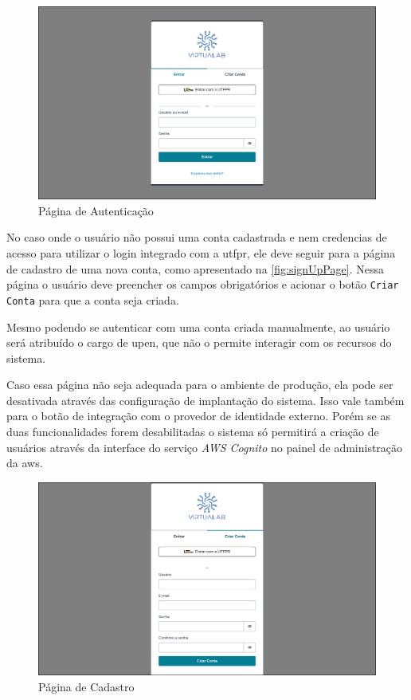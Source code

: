 \begin{figure}[H]
\caption{Página de Autenticação}
\label{fig:signInPage}
\includegraphics[width=\textwidth]{capitulos/3-resultados/files/sign-in.png}
\end{figure}

No caso onde o usuário não possui uma conta cadastrada e nem credencias de acesso para utilizar o login integrado com a \gls{utfpr}, ele deve seguir para a página de cadastro de uma nova conta, como apresentado na \autoref{fig:signUpPage}. Nessa página o usuário deve preencher os campos obrigatórios e acionar o botão \texttt{Criar Conta}  para que a conta seja criada.

Mesmo podendo se autenticar com uma conta criada manualmente, ao usuário será atribuído o cargo de \gls{upen}, que não o permite interagir com os recursos do sistema.

Caso essa página não seja adequada para o ambiente de produção, ela pode ser desativada através das configuração de implantação do sistema. Isso vale também para o botão de integração com o provedor de identidade externo. Porém se as duas funcionalidades forem desabilitadas o sistema só permitirá a criação de usuários através da interface do serviço \textit{AWS Cognito} no painel de administração da \gls{aws}.


\begin{figure}[H]
\caption{Página de Cadastro}
\label{fig:signUpPage}
\includegraphics[width=\textwidth]{capitulos/3-resultados/files/sign-up.png}
\end{figure}

